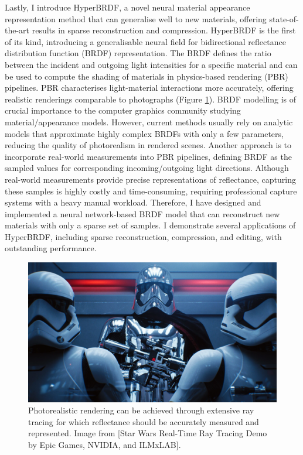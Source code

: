 Lastly, I introduce HyperBRDF, a novel neural material appearance representation method that can generalise well to new materials, offering state-of-the-art results in sparse reconstruction and compression. HyperBRDF is the first of its kind, introducing a generalisable neural field for bidirectional reflectance distribution function (\gls{BRDF}) representation. The BRDF defines the ratio between the incident and outgoing light intensities for a specific material and can be used to compute the shading of materials in physics-based rendering (\gls{PBR}) pipelines. \gls{PBR} characterises light-material interactions more accurately, offering realistic renderings comparable to photographs (Figure \ref{fig:brdf-intro}). \gls{BRDF} modelling is of crucial importance to the computer graphics community studying material/appearance models. However, current methods usually rely on analytic models that approximate highly complex \gls{BRDF}s with only a few parameters, reducing the quality of photorealism in rendered scenes. Another approach is to incorporate real-world measurements into \gls{PBR} pipelines, defining \gls{BRDF} as the sampled values for corresponding incoming/outgoing light directions. Although real-world measurements provide precise representations of reflectance, capturing these samples is highly costly and time-consuming, requiring professional capture systems with a heavy manual workload. Therefore, I have designed and implemented a neural network-based \gls{BRDF} model that can reconstruct new materials with only a sparse set of samples. I demonstrate several applications of HyperBRDF, including sparse reconstruction, compression, and editing, with outstanding performance.

\begin{figure}[ht]
  \centering

    \includegraphics[width=\linewidth]{Images/StarWars-RayTracing.jpeg}

   \caption{Photorealistic rendering can be achieved through extensive ray tracing for which reflectance should be accurately measured and represented. Image from [Star Wars Real-Time Ray Tracing Demo by Epic Games, NVIDIA, and ILMxLAB].}
   \label{fig:brdf-intro}
\end{figure}



